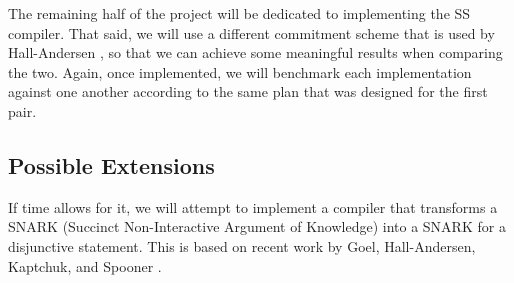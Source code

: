 The remaining half of the project will be dedicated to implementing the SS compiler. That said, we will use a different commitment scheme that is used by Hall-Andersen \cite{MHAStackSig}, so that we can achieve some meaningful results when comparing the two. Again, once implemented, we will benchmark each implementation against one another according to the same plan that was designed for the first pair.

\subsection{Possible Extensions}

If time allows for it, we will attempt to implement a compiler that transforms a SNARK (Succinct Non-Interactive Argument of Knowledge) into a SNARK for a disjunctive statement. This is based on recent work by Goel, Hall-Andersen, Kaptchuk, and Spooner \cite{SpeedStacking}.